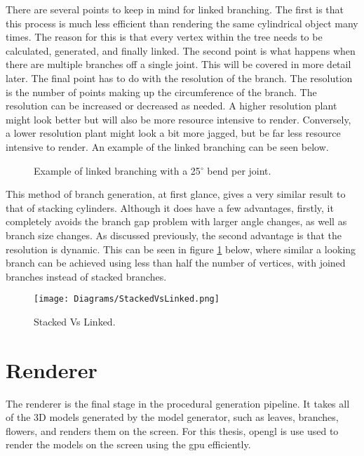 There are several points to keep in mind for linked branching. The first is that this process is much less efficient than rendering the same cylindrical object many times. The reason for this is that every vertex within the tree needs to be calculated, generated, and finally linked. The second point is what happens when there are multiple branches off a single joint. This will be covered in more detail later. The final point has to do with the resolution of the branch. The resolution is the number of points making up the circumference of the branch. The resolution can be increased or decreased as needed. A higher resolution plant might look better but will also be more resource intensive to render. Conversely, a lower resolution plant might look a bit more jagged, but be far less resource intensive to render. An example of the linked branching can be seen below.

\begin{figure}[htbp]
	{\centering
		\vspace{7px}
		\setlength{\fboxrule}{1pt}
		\caption{Example of linked branching with a 25$^{\circ}$ bend per joint.}
	}
\end{figure}
\FloatBarrier

\noindent
This method of branch generation, at first glance, gives a very similar result to that of stacking cylinders. Although it does have a few advantages, firstly, it completely avoids the branch gap problem with larger angle changes, as well as branch size changes. As discussed previously, the second advantage is that the resolution is dynamic. This can be seen in figure \ref{stackedvslinked} below, where similar a looking branch can be achieved using less than half the number of vertices, with joined branches instead of stacked branches.


\begin{figure}[htbp]
	{\centering
		\vspace{7px}
		\texttt{[image: Diagrams/StackedVsLinked.png]}\label{stackedvslinked}
		\caption{Stacked Vs Linked.}
	}
\end{figure}
\FloatBarrier

\section{Renderer}

\noindent
The renderer is the final stage in the procedural generation pipeline. It takes all of the 3D models generated by the model generator, such as leaves, branches, flowers, and renders them on the screen.  For this thesis, \acrshort{opengl} is use used to render the models on the screen using the \acrshort{gpu} efficiently. 

